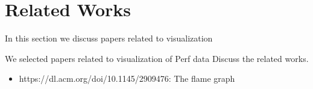 \section{Related Works}

In this section we discuss papers related to visualization

We selected papers related to visualization of Perf data
Discuss the related works.

\begin{itemize}
	\item https://dl.acm.org/doi/10.1145/2909476: The flame graph
\end{itemize}

